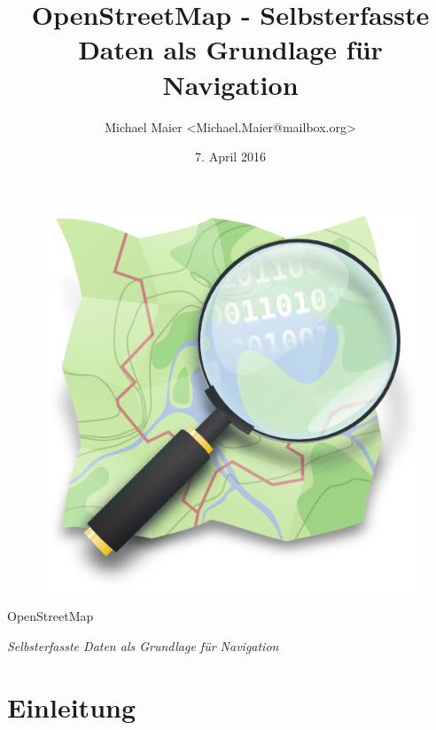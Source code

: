 \documentclass{beamer}
\title{OpenStreetMap - Selbsterfasste Daten als Grundlage für Navigation}
\author{Michael Maier \textless Michael.Maier@mailbox.org\textgreater}
\date{7. April 2016}
\begin{document}

\begin{frame} 


\begin{figure}
  \centering
  \includegraphics[width=.5\textwidth]{mag_map.png}
\end{figure}

\begin{center}
\Huge{OpenStreetMap\\}
\end{center}

\begin{center}
\Large{\emph{Selbsterfasste Daten als Grundlage für Navigation}}
\end{center}

\end{frame}


\section{Einleitung}
\end{document}
